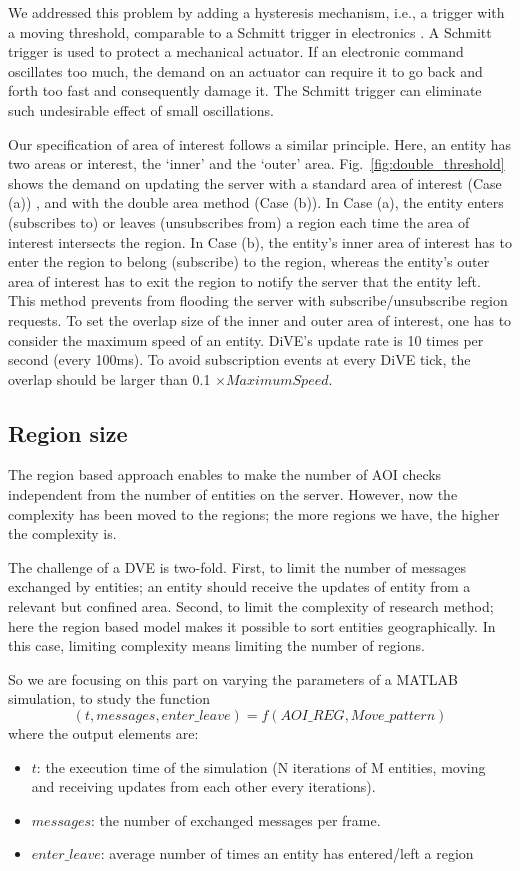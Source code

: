 \documentclass[]{elsarticle}
\begin{document}
We addressed this problem by adding a hysteresis mechanism, i.e., a trigger with a moving threshold, comparable to a Schmitt trigger in electronics \cite{Schmitt.1938}. A Schmitt trigger is used to protect a mechanical actuator. If an electronic command oscillates too much, the demand on an actuator can require it to go back and forth too fast and consequently damage it. The Schmitt trigger can eliminate such undesirable effect of small oscillations.

Our specification of area of interest follows a similar principle. Here, an entity has two areas or interest, the `inner' and the `outer' area. Fig.~\ref{fig:double_threshold} shows the demand on updating the server with a standard area of interest (Case (a)) , and with the double area method (Case (b)). In Case (a), the entity enters (subscribes to) or leaves (unsubscribes from) a region each time the area of interest intersects the region. In Case (b), the entity's inner area of interest has to enter the region to belong (subscribe) to the region, whereas the entity's outer area of interest has to exit the region to notify the server that the entity left. This method prevents from flooding the server with subscribe/unsubscribe region requests.
To set the overlap size of the inner and outer area of interest, one has to consider the maximum speed of an entity. DiVE's update rate is 10 times per second (every 100ms). To avoid subscription events at every DiVE tick, the overlap should be larger than 0.1 $\times MaximumSpeed$.

\subsection{Region size}
The region based approach enables to make the number of AOI checks independent from the number of entities on the server. However, now the complexity has been moved to the regions; the more regions we have, the higher the complexity is.

The challenge of a DVE is two-fold. First, to limit the number of messages exchanged by entities; an entity should receive the updates of entity from a relevant but confined area.
Second, to limit the complexity of research method; here the region based model makes it possible to sort entities geographically. In this case, limiting complexity means limiting the number of regions.

So we are focusing on this part on varying the parameters of a MATLAB simulation, to study the function
\[
(t,messages,enter\_leave) = f(AOI\_REG,Move\_pattern)
\]
where the output elements are:
\begin{itemize}
\item $t$: the execution time of the simulation (N iterations of M entities, moving and receiving updates from each other every iterations).
\item $messages$: the number of exchanged messages per frame.
\item $enter\_leave$: average number of times an entity has entered/left a region
\end{itemize}
\end{document}
